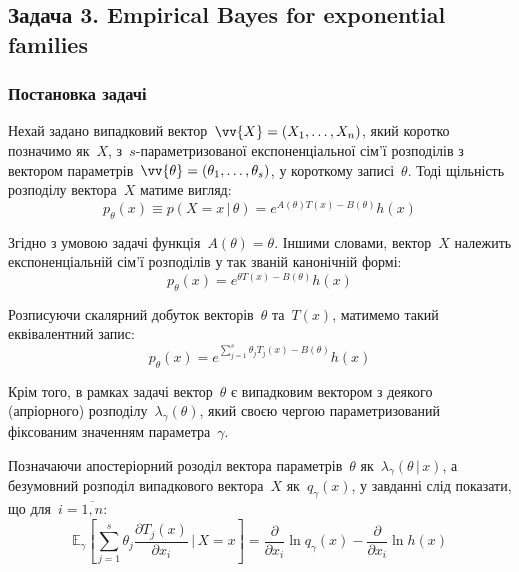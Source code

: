 \subsection*{Задача 3. Empirical Bayes for exponential families}

\setcounter{subsection}{3}
\setcounter{equation}{0}

\subsubsection*{Постановка задачі}

Нехай задано випадковий вектор~$\vv{X}=(X_1,\ldots,X_n)$, який коротко позначимо як~$X$, з~$s$-параметризованої експоненціальної сім'ї розподілів з вектором параметрів~$\vv{\theta}=(\theta_1,\ldots,\theta_s)$, у короткому записі~$\theta$. Тоді щільність розподілу вектора~$X$ матиме вигляд:
\begin{equation}
    p_{\theta}(x) \equiv p(X=x \,|\, \theta) = e^{A(\theta)T(x) - B(\theta)}h(x)
\end{equation}

Згідно з умовою задачі функція~$A(\theta)=\theta$. Іншими словами, вектор~$X$ належить експоненціальній сім'ї розподілів у так званій канонічній формі:
\begin{equation}
    p_{\theta}(x) = e^{\theta T(x) - B(\theta)}h(x)
\end{equation}

Розписуючи скалярний добуток векторів~$\theta$ та~$T(x)$, матимемо такий еквівалентний запис:
\begin{equation}\label{eq: likelihood vec X | vec theta}
    p_{\theta}(x) = e^{\sum\limits_{j=1}^{s}\theta_j T_j(x) - B(\theta)}h(x)
\end{equation}

Крім того, в рамках задачі вектор~$\theta$ є випадковим вектором з деякого (апріорного) розподілу~$\lambda_{\gamma}(\theta)$, який своєю чергою параметризований фіксованим значенням параметра~$\gamma$.

Позначаючи апостеріорний розоділ вектора параметрів~$\theta$ як~$\lambda_{\gamma}(\theta \,|\, x)$, а безумовний розподіл випадкового вектора~$X$ як~$q_{\gamma}(x)$, у завданні слід показати, що для~$i=\overline{1,n}:$
\begin{equation}\label{eq: E sum}
    \mathbb{E}_{\gamma}\left[ \sum\limits_{j=1}^{s}\theta_j\frac{\partial T_j(x)}{\partial x_i} \,|\, X=x  \right] = \frac{\partial}{\partial x_i}\ln{q_{\gamma}(x)} - \frac{\partial}{\partial x_i}\ln{h(x)}
\end{equation}

